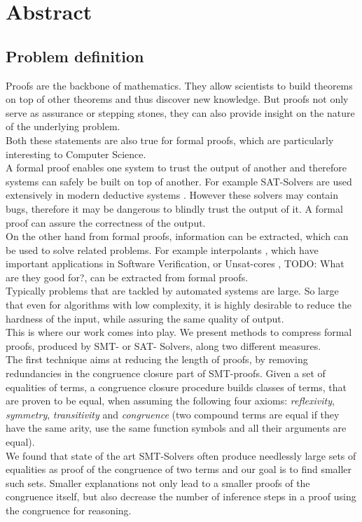 \chapter*{Abstract}

\section{Problem definition}

Proofs are the backbone of mathematics. 
They allow scientists to build theorems on top of other theorems and thus discover new knowledge.
But proofs not only serve as assurance or stepping stones, they can also provide insight on the nature of the underlying problem.\\
Both these statements are also true for formal proofs, which are particularly interesting to Computer Science.\\
A formal proof enables one system to trust the output of another and therefore systems can safely be built on top of another. 
For example SAT-Solvers are used extensively in modern deductive systems \cite{TODO}. 
However these solvers may contain bugs, therefore it may be dangerous to blindly trust the output of it.
A formal proof can assure the correctness of the output.\\
On the other hand from formal proofs, information can be extracted, which can be used to solve related problems.
For example interpolants \cite{TODO}, which have important applications in Software Verification, or Unsat-cores \cite{TODO}, TODO: What are they good for?, can be extracted from formal proofs.\\

Typically problems that are tackled by automated systems are large. 
So large that even for algorithms with low complexity, it is highly desirable to reduce the hardness of the input, while assuring the same quality of output.\\
This is where our work comes into play.
We present methods to compress formal proofs, produced by SMT- or SAT- Solvers, along two different measures.\\

The first technique aims at reducing the length of proofs, by removing redundancies in the congruence closure part of SMT-proofs.
Given a set of equalities of terms, a congruence closure procedure builds classes of terms, that are proven to be equal, when assuming the following four axioms: \emph{reflexivity}, \emph{symmetry}, \emph{transitivity} and \emph{congruence} (two compound terms are equal if they have the same arity, use the same function symbols and all their arguments are equal).\\
We found that state of the art SMT-Solvers often produce needlessly large sets of equalities as proof of the congruence of two terms 
and our goal is to find smaller such sets.
Smaller explanations not only lead to a smaller proofs of the congruence itself, 
but also decrease the number of inference steps in a proof using the congruence for reasoning.\\

